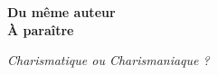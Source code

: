 \newpage
\mbox{}
\vfill
\begin{center}
{\bfseries Du même auteur\\À paraître}

\textit{Charismatique ou Charismaniaque ?}

\end{center}
\vfill
\vfill
\mbox{}
\thispagestyle{empty}

